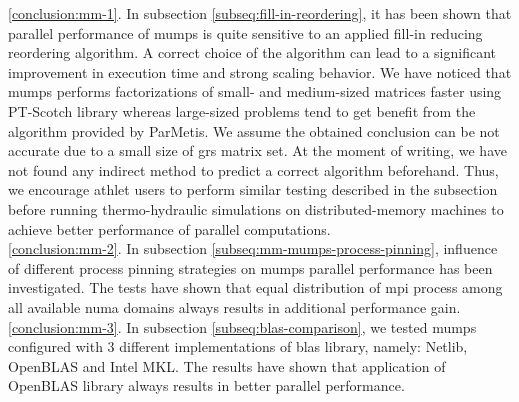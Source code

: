 \ref{conclusion:mm-1}. In subsection \ref{subseq:fill-in-reordering}, it has been shown that parallel performance of \gls{mumps} is quite sensitive to an applied fill-in reducing reordering algorithm. A correct choice of the algorithm can lead to a significant improvement in execution time and strong scaling behavior. We have noticed that \gls{mumps} performs factorizations of small- and medium-sized matrices faster using PT-Scotch library whereas large-sized problems tend to get benefit from the algorithm provided by ParMetis. We assume the obtained conclusion can be not accurate due to a small size of \gls{grs} matrix set. At the moment of writing, we have not found any indirect method to predict a correct algorithm beforehand. Thus, we encourage \gls{athlet} users to perform similar testing described in the subsection before running thermo-hydraulic simulations on distributed-memory machines to achieve better performance of parallel computations.\\




\ref{conclusion:mm-2}. In subsection \ref{subseq:mm-mumps-process-pinning}, influence of different process pinning strategies on \gls{mumps} parallel performance has been investigated. The tests have shown that equal distribution of \gls{mpi} process among all available \gls{numa} domains always results in additional performance gain.\\ %


\ref{conclusion:mm-3}. 
In subsection \ref{subseq:blas-comparison},
we tested \gls{mumps} configured with 3 different implementations of \gls{blas} library, namely: Netlib, OpenBLAS and Intel MKL. The results have shown that application of OpenBLAS library always results in better parallel performance.\\




